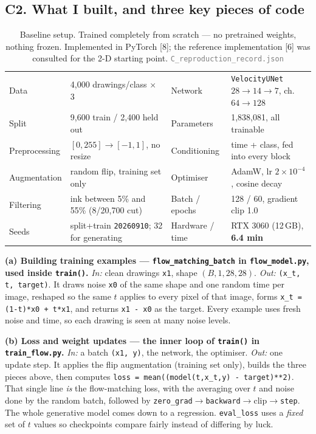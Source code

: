 \documentclass[12pt,a4paper]{article}
\newcommand{\file}[1]{\textcolor{gray}{\small\texttt{#1}}}
\begin{document}
\subsection{C2. What I built, and three key pieces of code}

\begin{table}[H]\centering\small
\caption{Baseline setup. Trained completely from scratch --- no pretrained weights, nothing frozen.
Implemented in PyTorch [8]; the reference implementation [6] was consulted for the 2-D starting point.
\file{C\_reproduction\_record.json}}
\label{tab:Cconf}
\begin{tabular}{@{}llll@{}}
\toprule
Data & 4{,}000 drawings/class $\times$ 3 & Network & \texttt{VelocityUNet} $28{\to}14{\to}7$, ch.\ $64{\to}128$ \\
Split & 9{,}600 train / 2{,}400 held out & Parameters & 1{,}838{,}081, all trainable \\
Preprocessing & $[0,255]\!\to\![-1,1]$, no resize & Conditioning & time + class, fed into every block \\
Augmentation & random flip, training set only & Optimiser & AdamW, lr $2\!\times\!10^{-4}$, cosine decay \\
Filtering & ink between 5\% and 55\% (8/20{,}700 cut) & Batch / epochs & 128 / 60, gradient clip 1.0 \\
Seeds & split+train \texttt{20260910}; 32 for generating & Hardware / time & RTX 3060 (12\,GB), \textbf{6.4 min} \\
\bottomrule
\end{tabular}
\end{table}

\textbf{(a) Building training examples --- \texttt{flow\_matching\_batch} in \texttt{flow\_model.py},
used inside \texttt{train()}.} \emph{In:} clean drawings \texttt{x1}, shape $(B,1,28,28)$. \emph{Out:} \texttt{(x\_t, t, target)}. It draws
noise \texttt{x0} of the same shape and one random time per image, reshaped so the same $t$ applies to every
pixel of that image, forms \texttt{x\_t = (1-t)*x0 + t*x1}, and returns \texttt{x1 - x0} as the target. Every
example uses fresh noise and time, so each drawing is seen at many noise levels.

\textbf{(b) Loss and weight updates --- the inner loop of \texttt{train()} in \texttt{train\_flow.py}.}
\emph{In:} a batch \texttt{(x1, y)}, the network, the optimiser. \emph{Out:} one update step. It applies
the flip augmentation (training set only), builds the three pieces above, then computes
\texttt{loss = mean((model(t,x\_t,y) - target)**2)}. That single line \emph{is} the flow-matching loss,
with the averaging over $t$ and noise done by the random batch, followed by
\texttt{zero\_grad}$\to$\texttt{backward}$\to$clip$\to$\texttt{step}. The whole generative model comes
down to a regression. \texttt{eval\_loss} uses a \emph{fixed} set of $t$ values so checkpoints compare
fairly instead of differing by luck.
\end{document}
